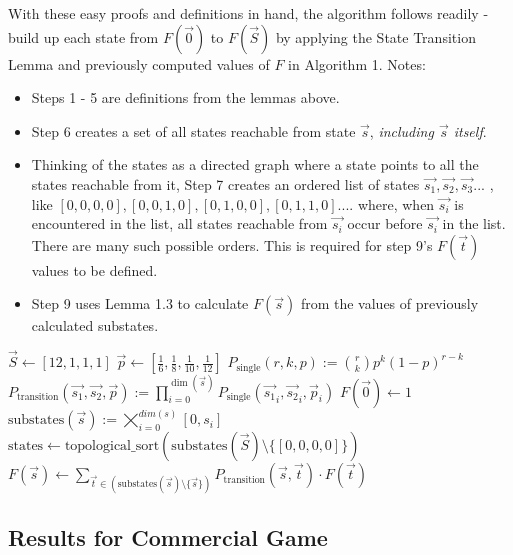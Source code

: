 \documentclass[11pt, oneside]{article} 	%
\begin{document}
With these easy proofs and definitions in hand, the algorithm follows readily - build up each state from $F(\vec{0})$ to $F(\vec{S})$ by applying the State Transition Lemma and previously computed values of $F$ in Algorithm 1. Notes:
\begin{itemize}
\item Steps 1 - 5 are definitions from the lemmas above.
\item Step 6 creates a set of all states reachable from state $\vec{s}$, \textit{including $\vec{s}$ itself}.  
\item Thinking of the states as a directed graph where a state points to all the states reachable from it, Step 7 creates an ordered list of states $\vec{s_1}, \vec{s_2}, \vec{s_3}...$ , \\
like $[0,0,0,0], [0,0,1,0], [0,1,0,0], [0,1,1,0]....$ where, when $\vec{s_i}$ is encountered in the list, all states reachable from $\vec{s_i}$ occur before $\vec{s_i}$ in the list.  There are many such possible orders. This is required for step 9's $F(\vec{t})$ values to be defined.
\item Step 9 uses Lemma 1.3 to calculate $F(\vec{s})$ from the values of previously calculated substates.
\end{itemize}


\begin{algorithm}[h]
\caption{Dynamic program for $F(\vec{S})$}
\begin{algorithmic}[1]
\State $\vec{S} \gets [12,1,1,1]$
\State $\vec{p} \gets \left[\tfrac{1}{6}, \tfrac{1}{8}, \tfrac{1}{10}, \tfrac{1}{12}\right]$
\State $P_{\text{single}}(r,k,p) := \binom{r}{k} p^k (1-p)^{r-k}$
\State $P_{\text{transition}}(\vec{s_1},\vec{s_2},\vec{p}) := \prod_{i=0}^{\dim(\vec{s})} P_{\text{single}}(\vec{s_1}_i,\vec{s_2}_i,\vec{p}_i)$
\State $F(\vec{0}) \gets 1$
\State $\text{substates}(\vec{s}) := \bigtimes\limits_{i=0}^{dim(s)} [0, s_i] $
\State $\text{states} \gets \text{topological\_sort}\!\left(\text{substates}(\vec{S}) \setminus \{[0,0,0,0]\}\right)$
  \State $F(\vec{s}) \gets \sum_{\vec{t} \in \left(\text{substates}(\vec{s}) \setminus \{\vec{s}\}\right)} 
     P_{\text{transition}}(\vec{s},\vec{t}) \cdot F(\vec{t})$
\EndFor
\end{algorithmic}
\end{algorithm}

\subsection{Results for Commercial Game}
\end{document}
